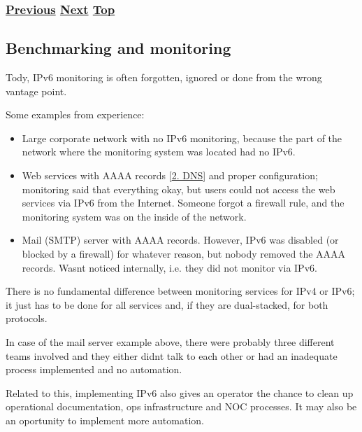 \documentclass[
]{article}
\begin{document}
\subsubsection{\texorpdfstring{\hyperref[address-and-prefix-management]{Previous}
\hyperref[benchmarking-and-monitoring]{Next}
\hyperref[management-and-operations]{Top}}{Previous Next Top}}\label{previous-next-top-21}

\pagebreak

\subsection{Benchmarking and
monitoring}\label{benchmarking-and-monitoring}

Tody, IPv6 monitoring is often forgotten, ignored or done from the wrong
vantage point.

Some examples from experience:

\begin{itemize}
\item
  Large corporate network with no IPv6 monitoring, because the part of
  the network where the monitoring system was located had no IPv6.
\item
  Web services with AAAA records {[}\hyperref[dns]{2. DNS}{]} and proper
  configuration; monitoring said that everything okay, but users could
  not access the web services via IPv6 from the Internet. Someone forgot
  a firewall rule, and the monitoring system was on the inside of the
  network.
\item
  Mail (SMTP) server with AAAA records. However, IPv6 was disabled (or
  blocked by a firewall) for whatever reason, but nobody removed the
  AAAA records. Wasn\textquotesingle t noticed internally, i.e. they did
  not monitor via IPv6.
\end{itemize}

There is no fundamental difference between monitoring services for IPv4
or IPv6; it just has to be done for all services and, if they are
dual-stacked, for both protocols.

In case of the mail server example above, there were probably three
different teams involved and they either didn\textquotesingle t talk to
each other or had an inadequate process implemented and no automation.

Related to this, implementing IPv6 also gives an operator the chance to
clean up operational documentation, ops infrastructure and NOC
processes. It may also be an oportunity to implement more automation.
\end{document}
